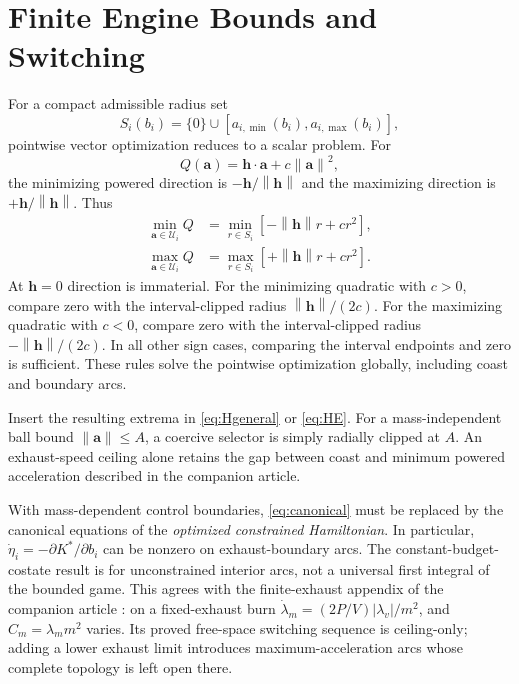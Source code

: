 \documentclass[journal,a4paper]{IEEEtran}
\newcommand{\U}{\mathcal U}
\newcommand{\norm}[1]{\left\|#1\right\|}
\begin{document}
\section{Finite Engine Bounds and Switching}
\label{sec:bounded}
For a compact admissible radius set
\begin{equation}
 S_i(b_i)=\{0\}\cup[a_{i,\min}(b_i),a_{i,\max}(b_i)],
\end{equation}
pointwise vector optimization reduces to a scalar problem. For
\begin{equation}
 Q(\mathbf a)=\mathbf h\cdot\mathbf a+c\norm{\mathbf a}^2,
\end{equation}
the minimizing powered direction is $-\mathbf h/\norm{\mathbf h}$ and the maximizing direction is $+\mathbf h/\norm{\mathbf h}$. Thus
\begin{align}
 \min_{\mathbf a\in\U_i}Q
     &=\min_{r\in S_i}[-\norm{\mathbf h}r+cr^2],\label{eq:minradius}\\
 \max_{\mathbf a\in\U_i}Q
     &=\max_{r\in S_i}[+\norm{\mathbf h}r+cr^2].\label{eq:maxradius}
\end{align}
At $\mathbf h=0$ direction is immaterial. For the minimizing quadratic with $c>0$, compare zero with the interval-clipped radius $\norm{\mathbf h}/(2c)$. For the maximizing quadratic with $c<0$, compare zero with the interval-clipped radius $-\norm{\mathbf h}/(2c)$. In all other sign cases, comparing the interval endpoints and zero is sufficient. These rules solve the pointwise optimization globally, including coast and boundary arcs.

Insert the resulting extrema in \eqref{eq:Hgeneral} or \eqref{eq:HE}. For a mass-independent ball bound $\norm{\mathbf a}\le A$, a coercive selector is simply radially clipped at $A$. An exhaust-speed ceiling alone retains the gap between coast and minimum powered acceleration described in the companion article.

With mass-dependent control boundaries, \eqref{eq:canonical} must be replaced by the canonical equations of the \emph{optimized constrained Hamiltonian}. In particular, $\dot\eta_i=-\partial K^*/\partial b_i$ can be nonzero on exhaust-boundary arcs. The constant-budget-costate result is for unconstrained interior arcs, not a universal first integral of the bounded game. This agrees with the finite-exhaust appendix of the companion article \cite{OlsinaCompanion}: on a fixed-exhaust burn $\dot\lambda_m=(2P/V)|\lambda_v|/m^2$, and $C_m=\lambda_m m^2$ varies. Its proved free-space switching sequence is ceiling-only; adding a lower exhaust limit introduces maximum-acceleration arcs whose complete topology is left open there.
\end{document}

